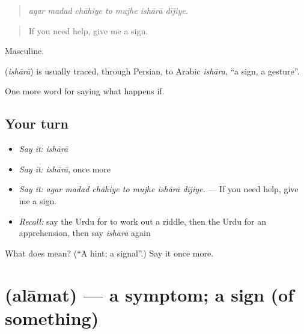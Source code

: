 \begin{quote}
      
\end{quote}

\begin{quote}
\emph{agar madad chāhiye to mujhe ishārā dījiye.}
\end{quote}

\begin{quote}
If you need help, give me a sign.
\end{quote}

Masculine.

\begin{cousinweb}
\textbf{} (\emph{ishārā}) is usually traced, through Persian, to Arabic \emph{ishāra}, \textquotedblleft{}a sign, a gesture\textquotedblright{}.
\end{cousinweb}

\begin{grammarlens}[title={What you've built}]
One more word for saying what happens if.
\end{grammarlens}

\subsection*{Your turn}
\begin{itemize}
\raggedright
  \item \emph{Say it:} \emph{ishārā}
  \item \emph{Say it:} \emph{ishārā}, once more
  \item \emph{Say it:} \emph{agar madad chāhiye to mujhe ishārā dījiye.} — If you need help, give me a sign.
  \item \emph{Recall:} say the Urdu for to work out a riddle, then the Urdu for an apprehension, then say \emph{ishārā} again
\end{itemize}

\begin{tcolorbox}[breakable,colback=teal!4,colframe=teal!35!black,title={Before you move on}]
What does  mean? (\textquotedblleft{}A hint; a signal\textquotedblright{}.) Say it once more.
\end{tcolorbox}
\section[\texorpdfstring{\ur{علامت} (alāmat)}{علامت (alāmat)}]{ (alāmat) — a symptom; a sign (of something)}

